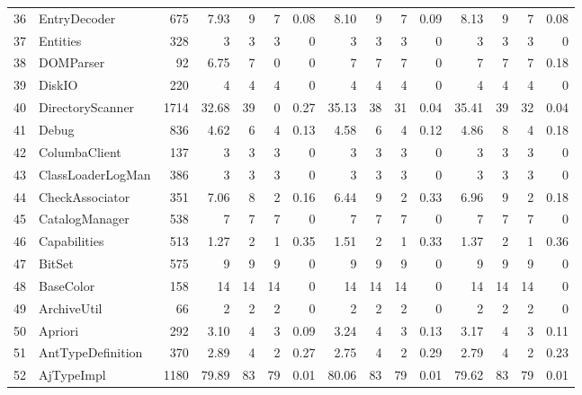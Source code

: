\documentclass{acm_proc_article-sp}
\begin{document}
\begin{table} [htp!]
{\begin{tabularx}{1.2 \textwidth}{r l r r r r r r r r r r r r r}
 36						& EntryDecoder				&675	& 7.93&	9	&	7	& 		0.08					& 8.10	& 9 		& 7		& 		0.09			& 8.13		& 9			& 7			&	0.08\\ 
 37						& Entities						&328	& 3	&	3	&	3	& 		0					& 3		& 3 		& 3		& 		0			& 3			& 3			& 3			&	0\\      
 38						& DOMParser					&92	& 6.75&	7	&	0	& 		0					& 7		& 7 		& 7		& 		0			& 7			& 7			& 7			&	0.18\\      
 39						& DiskIO						&220	& 4	&	4	&	4	& 		0					& 4		& 4 		& 4		& 		0			& 4			& 4			& 4			&	0\\      
 40						& DirectoryScanner				&1714	& 32.68&	39	&	0	& 		0.27					& 35.13	& 38 		& 31		& 		0.04			& 35.41		& 39			& 32			&	0.04\\      
 41						& Debug						&836	& 4.62&	6	&	4	& 		0.13					& 4.58	& 6 		& 4		& 		0.12			& 4.86		& 8			& 4			&	0.18\\      
 42						& ColumbaClient				&137	& 3	&	3	&	3	& 		0					& 3		& 3 		& 3		& 		0			& 3			& 3			& 3			&	0\\      
 43						& ClassLoaderLogMan			&386	& 3	&	3	&	3	& 		0					& 3		& 3 		& 3		& 		0			& 3			& 3			& 3			&	0\\      
 44						& CheckAssociator				&351	& 7.06&	8	&	2	& 		0.16					& 6.44	& 9 		& 2		& 		0.33			& 6.96		& 9			& 2			&	0.18\\      
 45						& CatalogManager				&538	& 7	&	7	&	7	& 		0					& 7		& 7 		& 7		& 		0			& 7			& 7			& 7			&	0\\      
 46						& Capabilities					&513	& 1.27&	2	&	1	& 		0.35					& 1.51	& 2 		& 1		& 		0.33			& 1.37		& 2			& 1			&	0.36\\      
 47						& BitSet						&575	& 9	&	9	&	9	& 		0					& 9		& 9 		& 9		& 		0			& 9			& 9			& 9			&	0\\      
 48						& BaseColor					&158	& 14	&	14	&	14	& 		0					& 14		& 14 		& 14		& 		0			& 14			& 14			& 14			&	0\\      
 49						& ArchiveUtil					&66	& 2	&	2	&	2	& 		0					& 2		& 2 		& 2		& 		0			& 2			& 2			& 2			&	0\\      
 50						& Apriori						&292	& 3.10&	4	&	3	& 		0.09					& 3.24	& 4 		& 3		& 		0.13			& 3.17		& 4			& 3			&	0.11\\      
 51						& AntTypeDefinition				&370	& 2.89&	4	&	2	& 		0.27					& 2.75	& 4 		& 2		& 		0.29			& 2.79		& 4			& 2			&	0.23\\      
 52						& AjTypeImpl					&1180	& 79.89&	83	&	79	& 		0.01					& 80.06	& 83 		& 79		& 		0.01			& 79.62		& 83			& 79			&	0.01\\      

\end{tabularx}}
\end{table}
\end{document}
